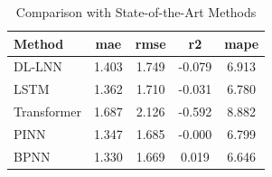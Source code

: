 \begin{table}[htbp]
\centering
\caption{Comparison with State-of-the-Art Methods}
\label{tab:table2_industrial_results}
\begin{tabular}{lcccc}
\toprule
Method & \textbf{mae} & \textbf{rmse} & \textbf{r2} & \textbf{mape} \\
\midrule
DL-LNN & 1.403 & 1.749 & -0.079 & 6.913 \\
LSTM & 1.362 & 1.710 & -0.031 & 6.780 \\
Transformer & 1.687 & 2.126 & -0.592 & 8.882 \\
PINN & 1.347 & 1.685 & -0.000 & 6.799 \\
BPNN & 1.330 & 1.669 & 0.019 & 6.646 \\
\bottomrule
\end{tabular}
\end{table}